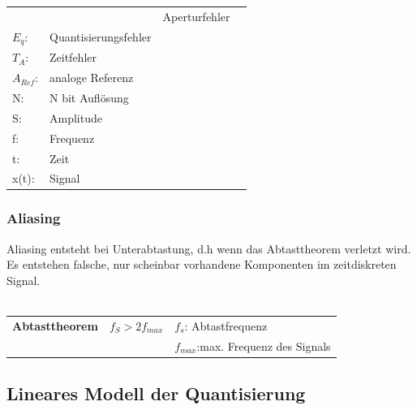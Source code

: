 \begin{longtable}[c]{ l  l l l }
\begin{minipage}{5cm}
\end{minipage}

&
\begin{minipage}{5cm}
\begin{tabular}{ll}
$E_{A}$: &Aperturfehler\\
$E_{q}$:&Quantisierungsfehler\\
$T_{A}$:&Zeitfehler\\
$A_{Ref}$:&analoge Referenz\\
N:& N bit Auflösung\\
S: &Amplitude\\
f: &Frequenz\\
t: &Zeit\\
x(t):&Signal
\end{tabular}


\end{minipage}
\\
\end{longtable}


\subsubsection{Aliasing}
Aliasing entsteht bei Unterabtastung, d.h wenn das Abtasttheorem verletzt wird.
Es entstehen falsche, nur scheinbar vorhandene Komponenten im zeitdiskreten
Signal.\\
\\

\begin{tabular}{lll}
\textbf{Abtasttheorem}&$f_{S}>2f_{max}$&$f_{s}$: Abtastfrequenz\\
&&$f_{max}$:max. Frequenz des Signals
\end{tabular}

\subsection{Lineares Modell der Quantisierung}
